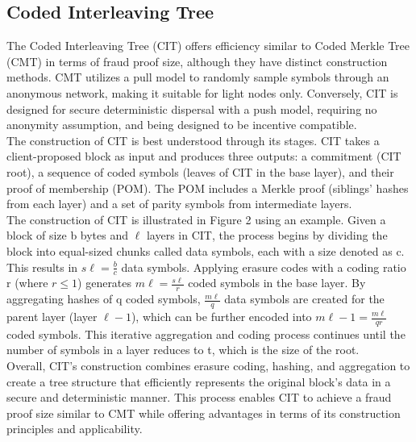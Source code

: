 \documentclass{report}
\begin{document}
\subsection{Coded Interleaving Tree}
The Coded Interleaving Tree (CIT) offers efficiency similar to Coded Merkle Tree (CMT) in terms of fraud proof size, although they have distinct construction methods. CMT utilizes a pull model to randomly sample symbols through an anonymous network, making it suitable for light nodes only. Conversely, CIT is designed for secure deterministic dispersal with a push model, requiring no anonymity assumption, and being designed to be incentive compatible.\\
The construction of CIT is best understood through its stages. CIT takes a client-proposed block as input and produces three outputs: a commitment (CIT root), a sequence of coded symbols (leaves of CIT in the base layer), and their proof of membership (POM). The POM includes a Merkle proof (siblings' hashes from each layer) and a set of parity symbols from intermediate layers.\\
The construction of CIT is illustrated in Figure 2 using an example. Given a block of size b bytes and $\ell$ layers in CIT, the process begins by dividing the block into equal-sized chunks called data symbols, each with a size denoted as c. This results in $s\ell = \frac{b}{c}$ data symbols. Applying erasure codes with a coding ratio r (where $r ≤ 1$) generates $m\ell = \frac{s\ell}{r}$ coded symbols in the base layer. By aggregating hashes of q coded symbols, $\frac{m\ell}{q}$ data symbols are created for the parent layer (layer $\ell - 1$), which can be further encoded into $m\ell - 1 = \frac{m\ell}{qr}$ coded symbols. This iterative aggregation and coding process continues until the number of symbols in a layer reduces to t, which is the size of the root.\\
Overall, CIT's construction combines erasure coding, hashing, and aggregation to create a tree structure that efficiently represents the original block's data in a secure and deterministic manner. This process enables CIT to achieve a fraud proof size similar to CMT while offering advantages in terms of its construction principles and applicability.
\end{document}
